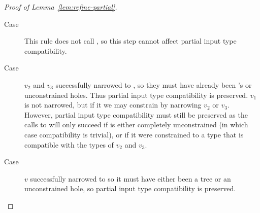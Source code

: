 \begin{proof}[Proof of Lemma~\ref{lem:refine-partial}]
\begin{description}
  \item[Case \releafgood] This rule does not call \forcesym, so this
    step cannot affect partial input type compatibility.

  \item[Case \renodegood]
    $v_2$ and $v_3$ successfully narrowed to , so they must have
    already been 's or unconstrained holes. Thus partial input type
    compatibility is preserved.
    $v_1$ is not narrowed, but if it \vhole{\thole} we may constrain
    \thole by narrowing $v_2$ or $v_3$. However, partial input type
    compatibility must still be preserved as the calls to \forcesym will
    only succeed if \thole is either completely unconstrained (in which
    case compatibility is trivial), or if it were constrained to a type
    that is compatible with the types of $v_2$ and $v_3$.


  \item[Case ] $v$ successfully narrowed to
    \ttree{\thole} so it must have either been a tree or an
    unconstrained hole, so partial input type compatibility is
    preserved.

  \end{description}
\end{proof}

